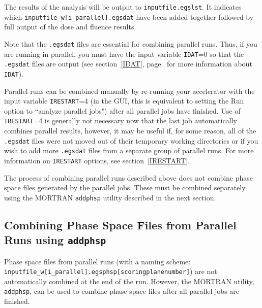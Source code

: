 \documentclass[12pt,twoside]{article}
\begin{document}
The results of the analysis will be output to {\tt inputfile.egslst}.
It
indicates which {\tt inputfile\_w[i\_parallel].egsdat} have
been added together followed by full output of the
dose and fluence results.

Note that the {\tt .egsdat} files are essential for combining
parallel runs.  Thus, if you are running in parallel, you must have
the input variable {\tt IDAT}=0 so that the {\tt .egsdat} files
are output (see section~\ref{IDAT}, page~\pageref{IDAT} for more
information about {\tt IDAT}).

Parallel runs can be combined manually by re-running your accelerator
with the input variable {\tt IRESTART}=4 (in the GUI, this is equivalent
to setting the Run option to ``analyze parallel jobs") after all parallel
jobs have finished.  Use of {\tt IRESTART}=4 is generally not necessary
now that the last job automatically combines parallel results, however,
it may be useful if, for some reason, all of the {\tt .egsdat} files were
not moved out of their temporary working directories or if you wish to
add more {\tt .egsdat} files from a separate group of parallel runs.
For more information on {\tt IRESTART} options, see section~\ref{IRESTART}.

The process of combining parallel runs described above does not
combine phase space files generated by the parallel jobs.  These
must be combined separately using the MORTRAN {\tt addphsp} utility
described in the next section.

\subsection{Combining Phase Space Files from Parallel Runs using {\tt addphsp}}
\label{addphspsect}

Phase space files from parallel runs (with a naming scheme: \\
{\tt inputfile\_w[i\_parallel].egsphsp[scoringplanenumber]})
are not automatically combined at the end of the run.
However, the MORTRAN utility, {\tt addphsp}, can be used to combine
phase space files after all parallel jobs are finished.
\end{document}
